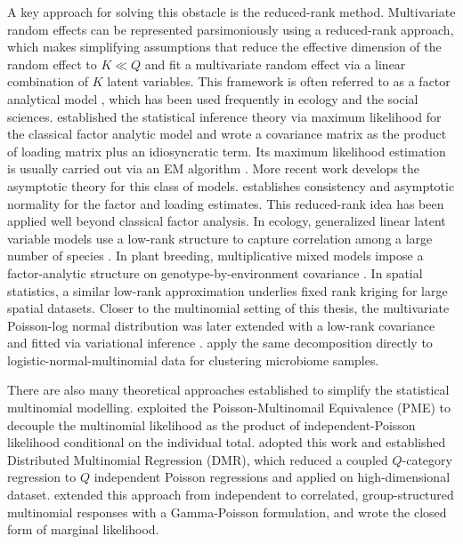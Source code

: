 A key approach for solving this obstacle is the reduced-rank method. Multivariate random effects can be represented parsimoniously using a reduced-rank approach, which makes simplifying assumptions that reduce the effective dimension of the random effect to $K\ll Q$ and fit a multivariate random effect via a linear combination of $K$ latent variables. This framework is often referred to as a factor analytical model \citep{Bartholomew2011}, which has been used frequently in ecology and the social sciences. \citet{Anderson1956} established the statistical inference theory via maximum likelihood for the classical factor analytic model and wrote a covariance matrix as the product of loading matrix plus an idiosyncratic term. Its maximum likelihood estimation is usually carried out via an EM algorithm \citep{Rubin1982}. More recent work develops the asymptotic theory for this class of models. \citet{BAI2012} establishes consistency and asymptotic normality for the factor and loading estimates. This reduced-rank idea has been applied well beyond classical factor analysis. In ecology, generalized linear latent variable models use a low-rank structure to capture correlation among a large number of species \citep{Niku2017}. In plant breeding, multiplicative mixed models impose a factor-analytic structure on genotype-by-environment covariance \citep{Smith2001}. In spatial statistics, a similar low-rank approximation underlies fixed rank kriging \citep{Cressie2008} for large spatial datasets. Closer to the multinomial setting of this thesis, the multivariate Poisson-log normal distribution \citep{Aitchison1989} was later extended with a low-rank covariance and fitted via variational inference \citep{Chiquet2018}. \citet{Tu2023} apply the same decomposition directly to logistic-normal-multinomial data for clustering microbiome samples.

There are also many theoretical approaches established to simplify the statistical multinomial modelling. \citet{Baker1994} exploited the Poisson-Multinomail Equivalence (PME) to decouple the multinomial likelihood as the product of independent-Poisson likelihood conditional on the individual total. \citet{Taddy2015} adopted this work and established Distributed Multinomial Regression (DMR), which reduced a coupled $Q$-category regression to $Q$ independent Poisson regressions and applied on high-dimensional dataset. \citet{Lee2017} extended this approach from independent to correlated, group-structured multinomial responses with a Gamma-Poisson formulation, and wrote the closed form of marginal likelihood.

